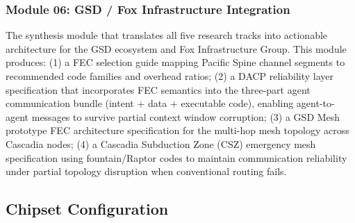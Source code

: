 \documentclass[11pt,letterpaper]{article}
\begin{document}
\subsubsection{Module 06: GSD / Fox Infrastructure Integration}

The synthesis module that translates all five research tracks into actionable architecture for the GSD ecosystem and Fox Infrastructure Group. This module produces: (1) a FEC selection guide mapping Pacific Spine channel segments to recommended code families and overhead ratios; (2) a DACP reliability layer specification that incorporates FEC semantics into the three-part agent communication bundle (intent + data + executable code), enabling agent-to-agent messages to survive partial context window corruption; (3) a GSD Mesh prototype FEC architecture specification for the multi-hop mesh topology across Cascadia nodes; (4) a Cascadia Subduction Zone (CSZ) emergency mesh specification using fountain/Raptor codes to maintain communication reliability under partial topology disruption when conventional routing fails.

\subsection{Chipset Configuration}
\end{document}
